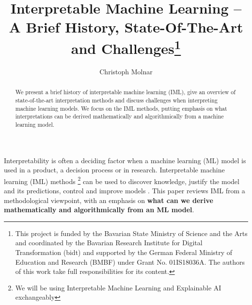 \documentclass[runningheads]{llncs}
\begin{document}
%
\title{Interpretable Machine Learning -- A Brief History, State-Of-The-Art and Challenges\thanks{This project is funded by the Bavarian State Ministry of Science and the Arts and coordinated by the Bavarian Research Institute for Digital Transformation (bidt) and supported by the German Federal Ministry of Education and Research (BMBF) under Grant No. 01IS18036A.
The authors of this work take full responsibilities for its content.
}}
%
%
\author{Christoph Molnar}
%
%
%
\maketitle              %
%
\begin{abstract}
  We present a brief history of interpretable machine learning (IML), give an overview of state-of-the-art interpretation methods and discuss challenges when interpreting machine learning models.
  We focus on the IML methods, putting emphasis on what interpretations can be derived mathematically and algorithmically from a machine learning model.

\end{abstract}
%
%
Interpretability is often a deciding factor when a machine learning (ML) model is used in a product, a decision process or in research.
Interpretable machine learning (IML) methods \footnote{We will be using Interpretable Machine Learning and Explainable AI exchangeably} can be used to discover knowledge, justify the model and its predictions, control and improve models \cite{adadi2018peeking}. 
This paper reviews IML from a methodological viewpoint, with an emphasis on \textbf{what can we derive mathematically and algorithmically from an ML model}.
\end{document}
